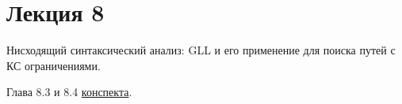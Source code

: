 \section{Лекция 8}
 
Нисходящий синтаксический анализ: GLL и его применение для поиска путей с КС ограничениями.


Глава 8.3 и 8.4 \href{https://github.com/YaccConstructor/articles/blob/master/InProgress/Formal_langs_CFPQ_course_notes/Formal_lang_CFPQ_course_notes.pdf}{конспекта}.
